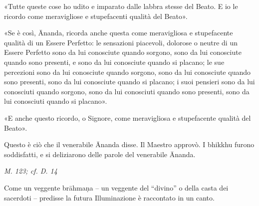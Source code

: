 «Tutte queste cose ho udito e imparato dalle labbra stesse del Beato. E
io le ricordo come meravigliose e stupefacenti qualità del Beato».


«Se è così, Ānanda, ricorda anche questa come meravigliosa e
stupefacente qualità di un Essere Perfetto: le sensazioni piacevoli,
dolorose o neutre di un Essere Perfetto sono da lui conosciute quando
sorgono, sono da lui conosciute quando sono presenti, e sono da lui
conosciute quando si placano; le sue percezioni sono da lui conosciute
quando sorgono, sono da lui conosciute quando sono presenti, sono da lui
conosciute quando si placano; i suoi pensieri sono da lui conosciuti
quando sorgono, sono da lui conosciuti quando sono presenti, sono da lui
conosciuti quando si placano».


«E anche questo ricordo, o Signore, come meravigliosa e stupefacente
qualità del Beato».


Questo è ciò che il venerabile Ānanda disse. Il Maestro approvò. I
bhikkhu furono soddisfatti, e si deliziarono delle parole del venerabile
Ānanda.


\emph{M. 123; cf. D. 14}


 Come un veggente brāhmaṇa – un veggente del “divino” o
della casta dei sacerdoti – predisse la futura Illuminazione è
raccontato in un canto.


